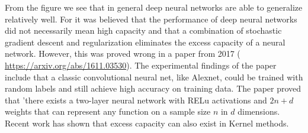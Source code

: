 From the figure we see that in general deep neural networks are able to generalize relatively well. For it was believed that the performance of deep neural networks did not necessarily mean high capacity and that a combination of stochastic gradient descent and regularization eliminates the excess capacity of a neural network. However, this was proved wrong in a paper from 2017 ( \url{https://arxiv.org/abs/1611.03530}). The experimental findings of the paper include that a classic convolutional neural net, like Alexnet, could be trained with random labels and still achieve high accuracy on training data. The paper proved that 'there exists a two-layer neural network with RELu activations and $2n+d$ weights that can represent any function on a sample size $n$ in $d$ dimensions. Recent work has shown that excess capacity can also exist in Kernel methods.

